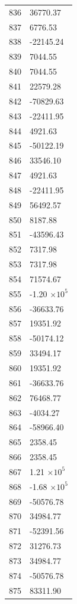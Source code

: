 \documentclass[a4paper,11pt]{article}
\begin{document}
\begin{center}
\begin{longtable}{|R{1.5cm}|R{2.5cm}|}
  836 &     36770.37 \\
  837 &      6776.53 \\
  838 &    -22145.24 \\
  839 &      7044.55 \\
  840 &      7044.55 \\
  841 &     22579.28 \\
  842 &    -70829.63 \\
  843 &    -22411.95 \\
  844 &      4921.63 \\
  845 &    -50122.19 \\
  846 &     33546.10 \\
  847 &      4921.63 \\
  848 &    -22411.95 \\
  849 &     56492.57 \\
  850 &      8187.88 \\
  851 &    -43596.43 \\
  852 &      7317.98 \\
  853 &      7317.98 \\
  854 &     71574.67 \\
  855 &        -1.20 $\times 10^{           5}$ \\
  856 &    -36633.76 \\
  857 &     19351.92 \\
  858 &    -50174.12 \\
  859 &     33494.17 \\
  860 &     19351.92 \\
  861 &    -36633.76 \\
  862 &     76468.77 \\
  863 &     -4034.27 \\
  864 &    -58966.40 \\
  865 &      2358.45 \\
  866 &      2358.45 \\
  867 &         1.21 $\times 10^{           5}$ \\
  868 &        -1.68 $\times 10^{           5}$ \\
  869 &    -50576.78 \\
  870 &     34984.77 \\
  871 &    -52391.56 \\
  872 &     31276.73 \\
  873 &     34984.77 \\
  874 &    -50576.78 \\
  875 &     83311.90 \\

\end{longtable}
\end{center}
\end{document}
